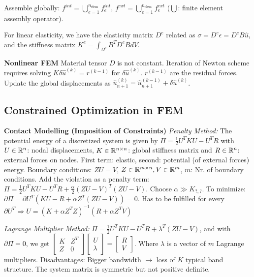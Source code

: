 Assemble globally: $f^{int} = \bigcup_{e=1}^{n_{\text{elem}}} f_e^{int}$,  $f^{ext} = \bigcup_{e=1}^{n_{\text{elem}}} f_e^{ext}$ ($\bigcup$: finite element assembly operator).

For linear elasticity, we have the elasticity matrix $D^e$ related as $\sigma= D^e \epsilon = D^e B \hat{u}$, and the stiffness matrix $K ^e = \int_{\Omega^e} B^T D^e B dV$.

\textbf{Nonlinear FEM}
Material tensor $D$ is not constant. Iteration of Newton scheme requires solving $K \delta \hat{u}^{(k)} = r^{(k-1)}$ for $\delta \hat{u}^{(k)}$.
$r^{(k-1)}$ are the residual forces.
Update the global displacements as $\hat{u}_{n+1}^{(k)} = \hat{u}_{n+1}^{(k-1)} + \delta \hat{u}^{(k)}$.

\subsection*{Constrained Optimization in FEM}
\textbf{Contact Modelling (Imposition of Constraints)}
\textit{Penalty Method:}
The potential energy of a discretized system is given by $\Pi = \frac{1}{2} U^T K U - U^T R$ with $U\in\mathbb{R}^n$: nodal displacements, $K\in\mathbb{R}^{n\times n}$: global stiffness matrix and $R\in\mathbb{R}^n$: external forces on nodes.
First term: elastic, second: potential (of external forces) energy.
Boundary conditions: $ZU=V$, $Z\in\mathbb{R}^{m \times n}, V\in \mathbb{R}^m$, $m$: Nr. of boundary conditions. 
Add the violation as a penalty term:
$\Pi = \frac{1}{2} U^T K U - U^T R + \frac{\alpha}{2}(ZU-V)^T(ZU-V)$.
Choose $\alpha \gg K_{?,?}$.
To minimize: $\partial\Pi = \partial U^T (KU -R+\alpha Z^T (ZU-V))=0$.
Has to be fulfilled for every $\partial U^T \Rightarrow U = (K+\alpha Z^T Z)^{-1} (R+\alpha Z^T V)$

\textit{Lagrange Multiplier Method:}
$\Pi = \frac{1}{2} U^T K U - U^T R + \lambda^T (ZU-V)$, and with $\partial \Pi = 0$, we get $\begin{bmatrix}
K & Z^T \\
Z & 0
\end{bmatrix} \begin{bmatrix}
U \\
\lambda
\end{bmatrix} = \begin{bmatrix}
R \\
V
\end{bmatrix}$.
Where $\lambda$ is a vector of $m$ Lagrange multipliers.
Disadvantages: Bigger bandwidth $\rightarrow$ loss of $K$ typical band structure. The system matrix is symmetric but not positive definite.